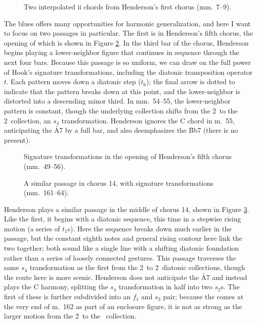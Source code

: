 \begin{figure}[tbp]
  \caption[Two interpolated \ii chords from Henderson's first chorus.]{Two
    interpolated ii chords from Henderson's first chorus (mm.~7--9).}
  \label{csa:ii7-interpolation}
\end{figure}

The blues offers many opportunities for harmonic generalization, and here I
want to focus on two passages in particular. The first is in
Henderson's fifth chorus, the opening of which is shown in Figure
\ref{csa:henderson-chorus-five}. In the third bar of the chorus, Henderson
begins playing a lower-neighbor figure that continues in sequence through the
next four bars. Because this passage is so uniform, we can draw on the full
power of Hook's signature transformations, including the diatonic
transposition operator $t$. Each pattern moves down a diatonic step
($t_6$); the final arrow is dotted to indicate that the pattern breaks down at
this point, and the lower-neighbor is distorted into a descending minor third.
In mm.~54--55, the lower-neighbor pattern is constant, though the underlying
collection shifts from the 2\flat\ to the 2\sharp\ collection, an $s_4$
transformation. Henderson ignores the C chord in m.~55,
anticipating the \h{A7} by a full bar, and also deemphasizes the \h{Bb7}
(there is no \Aflat present).

\begin{figure}[tbp]
  \caption[Signature transformations in the opening of Henderson's fifth
    chorus.]{Signature transformations in the opening of Henderson's fifth
    chorus (mm.~49--56).}
  \label{csa:henderson-chorus-five}
\end{figure}

\begin{figure}[tbp]
  \caption[A similar passage in chorus 14, with signature transformations.]{A
    similar passage in chorus 14, with signature transformations
    (mm.~161--64).}
  \label{csa:henderson-chorus-fourteen}
\end{figure}

Henderson plays a similar passage in the middle of chorus 14, shown in Figure
\ref{csa:henderson-chorus-fourteen}. Like the first, it begins with a diatonic
sequence, this time in a stepwise rising motion (a series of $t_1$s). Here the
sequence breaks down much earlier in the passage, but the constant eighth
notes and general rising contour here link the two together; both sound like a
single line with a shifting diatonic foundation rather than a series of
loosely connected gestures. This passage traverses the same $s_4$
transformation as the first from the 2\flat\ to 2\sharp\ diatonic collections,
though the route here is more scenic. Henderson does not anticipate the \h{A7}
and instead plays the C harmony, splitting the $s_4$ transformation in half
into two $s_2$s. The first of these is further subdivided into an $f_1$ and
$s_3$ pair; because the \Aflat comes at the very end of m.~162 as part of an
enclosure figure, it is not as strong as the larger motion from the 2\flat\ to
the \nat\ collection.

